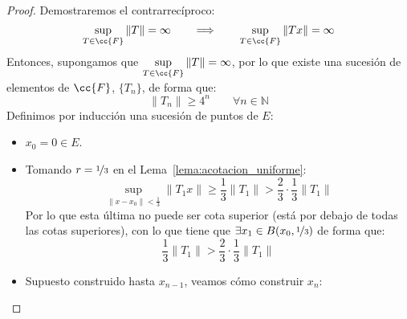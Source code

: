\begin{teo}
    \begin{proof}
        Demostraremos el contrarrecíproco:
        \begin{equation*}
            \sup_{T\in \cc{F}}\|T\| = \infty \qquad  \Longrightarrow \qquad  \sup_{T\in \cc{F}}\|Tx\| = \infty
        \end{equation*}
        Entonces, supongamos que $\sup\limits_{T\in \cc{F}}\|T\| = \infty$, por lo que existe una sucesión de elementos de $\cc{F}$, $\{T_n\}$, de forma que:
        \begin{equation*}
            \|T_n\| \geq 4^n \qquad \forall n\in \mathbb{N}
        \end{equation*}
        Definimos por inducción una sucesión de puntos de $E$:
        \begin{itemize}
            \item $x_0 = 0\in E$.
            \item Tomando $r = \nicefrac{1}{3}$ en el Lema~\ref{lema:acotacion_uniforme}:
                \begin{equation*}
                    \sup_{\|x-x_0\| < \frac{1}{3}}\|T_1x\| \geq \dfrac{1}{3}\|T_1\| > \dfrac{2}{3}\cdot \dfrac{1}{3}\|T_1\|
                \end{equation*}
                Por lo que esta última no puede ser cota superior (está por debajo de todas las cotas superiores), con lo que tiene que $\exists x_1\in B(x_0, \nicefrac{1}{3})$ de forma que:
                \begin{equation*}
                    \dfrac{1}{3}\|T_1\| > \dfrac{2}{3}\cdot \dfrac{1}{3} \|T_1\| 
                \end{equation*}
            \item Supuesto construido hasta $x_{n-1}$, veamos cómo construir $x_n$:


\end{itemize}
\end{proof}
\end{teo}
